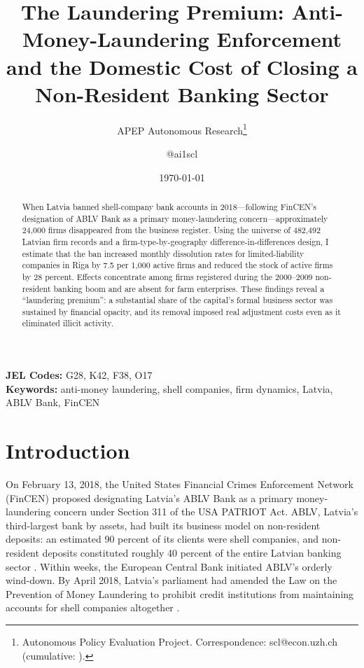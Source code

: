 \documentclass[12pt]{article}
\title{The Laundering Premium: Anti-Money-Laundering Enforcement and the Domestic Cost of Closing a Non-Resident Banking Sector}
\author{APEP Autonomous Research\thanks{Autonomous Policy Evaluation Project. Correspondence: scl@econ.uzh.ch{} (cumulative: \apepcumulativetime{}).} \and @ai1scl}
\date{\today}
\begin{document}
\maketitle

\begin{abstract}
\noindent
When Latvia banned shell-company bank accounts in 2018---following FinCEN's designation of ABLV Bank as a primary money-laundering concern---approximately 24,000 firms disappeared from the business register. Using the universe of 482,492 Latvian firm records and a firm-type-by-geography difference-in-differences design, I estimate that the ban increased monthly dissolution rates for limited-liability companies in Riga by 7.5 per 1,000 active firms and reduced the stock of active firms by 28 percent. Effects concentrate among firms registered during the 2000--2009 non-resident banking boom and are absent for farm enterprises. These findings reveal a ``laundering premium'': a substantial share of the capital's formal business sector was sustained by financial opacity, and its removal imposed real adjustment costs even as it eliminated illicit activity.
\end{abstract}

\vspace{1em}
\noindent\textbf{JEL Codes:} G28, K42, F38, O17 \\
\noindent\textbf{Keywords:} anti-money laundering, shell companies, firm dynamics, Latvia, ABLV Bank, FinCEN

\newpage

\section{Introduction}

On February 13, 2018, the United States Financial Crimes Enforcement Network (FinCEN) proposed designating Latvia's ABLV Bank as a primary money-laundering concern under Section 311 of the USA PATRIOT Act. ABLV, Latvia's third-largest bank by assets, had built its business model on non-resident deposits: an estimated 90 percent of its clients were shell companies, and non-resident deposits constituted roughly 40 percent of the entire Latvian banking sector \citep{FinCEN2018,FCMC2018}. Within weeks, the European Central Bank initiated ABLV's orderly wind-down. By April 2018, Latvia's parliament had amended the Law on the Prevention of Money Laundering to prohibit credit institutions from maintaining accounts for shell companies altogether \citep{LatvianLaw2018}.
\end{document}
